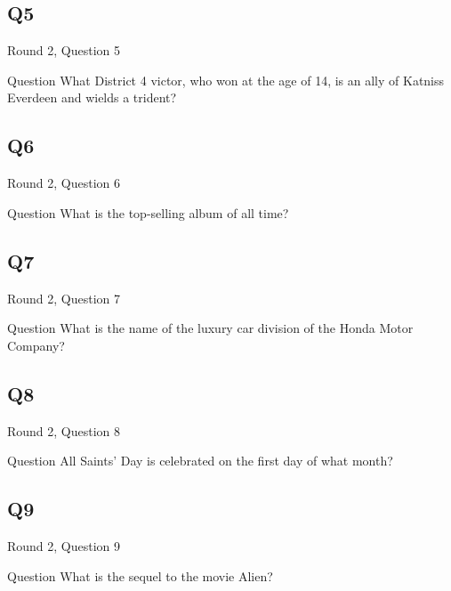 \documentclass[11pt]{beamer}
\begin{document}
\subsection*{Q5}
\begin{frame}[t]{Round 2, Question 5}
\vspace{2em}
\begin{block}{Question}
What District 4 victor, who won at the age of 14, is an ally of Katniss Everdeen and wields a trident\@?
\end{block}
\end{frame}
    

\subsection*{Q6}
\begin{frame}[t]{Round 2, Question 6}
\vspace{2em}
\begin{block}{Question}
What is the top-selling album of all time\@?
\end{block}
\end{frame}
    

\subsection*{Q7}
\begin{frame}[t]{Round 2, Question 7}
\vspace{2em}
\begin{block}{Question}
What is the name of the luxury car division of the Honda Motor Company\@?
\end{block}
\end{frame}
    

\subsection*{Q8}
\begin{frame}[t]{Round 2, Question 8}
\vspace{2em}
\begin{block}{Question}
All Saints' Day is celebrated on the first day of what month\@?
\end{block}
\end{frame}
    

\subsection*{Q9}
\begin{frame}[t]{Round 2, Question 9}
\vspace{2em}
\begin{block}{Question}
What is the sequel to the movie Alien\@?
\end{block}
\end{frame}
    
\end{document}
